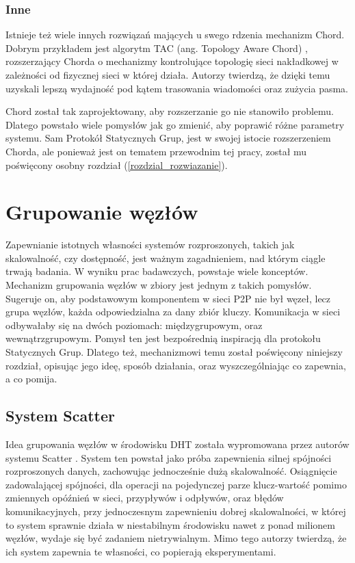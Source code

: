 \documentclass[12pt, twoside, openany]{report}
\begin{document}
\subsection{Inne}

Istnieje też wiele innych rozwiązań mających u swego rdzenia mechanizm Chord. Dobrym przykładem jest algorytm TAC (ang. Topology Aware Chord) \cite{bib:tac}, rozszerzający Chorda o mechanizmy kontrolujące topologię sieci nakładkowej w zależności od fizycznej sieci w której działa. Autorzy twierdzą, że dzięki temu uzyskali lepszą wydajność pod kątem trasowania wiadomości oraz zużycia pasma.

Chord został tak zaprojektowany, aby rozszerzanie go nie stanowiło problemu. Dlatego powstało wiele pomysłów jak go zmienić, aby poprawić różne parametry systemu. Sam Protokół Statycznych Grup, jest w swojej istocie rozszerzeniem Chorda, ale ponieważ jest on tematem przewodnim tej pracy, został mu poświęcony osobny rozdział (\ref{rozdzial_rozwiazanie}).


\chapter{Grupowanie węzłów}
\label{rozdzial_grupowanie}

Zapewnianie istotnych własności systemów rozproszonych, takich jak skalowalność, czy dostępność, jest ważnym zagadnieniem, nad którym ciągle trwają badania. W wyniku prac badawczych, powstaje wiele konceptów. Mechanizm grupowania węzłów w zbiory jest jednym z takich pomysłów. Sugeruje on, aby podstawowym komponentem w sieci P2P nie był węzeł, lecz grupa węzłów, każda odpowiedzialna za dany zbiór kluczy. Komunikacja w sieci odbywałaby się na dwóch poziomach: międzygrupowym, oraz wewnątrzgrupowym. Pomysł ten jest bezpośrednią inspiracją dla protokołu Statycznych Grup. Dlatego też, mechanizmowi temu został poświęcony niniejszy rozdział, opisując jego ideę, sposób działania, oraz wyszczególniając co zapewnia, a co pomija.

\section{System Scatter}

Idea grupowania węzłów w środowisku DHT została wypromowana przez autorów systemu Scatter \cite{bib:scatter}. System ten powstał jako próba zapewnienia silnej spójności rozproszonych danych,
zachowując jednocześnie dużą skalowalność. Osiągnięcie zadowalającej spójności, dla operacji na pojedynczej parze klucz-wartość pomimo zmiennych opóźnień w sieci, przypływów i odpływów, oraz błędów komunikacyjnych, przy jednoczesnym zapewnieniu dobrej skalowalności, w której to system sprawnie działa w niestabilnym środowisku nawet z ponad milionem węzłów, wydaje się być zadaniem nietrywialnym. Mimo tego autorzy twierdzą, że ich system zapewnia te własności, co popierają eksperymentami.
\end{document}
